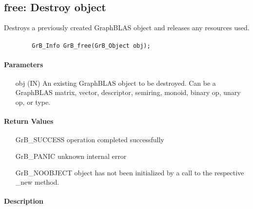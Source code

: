 \subsection{{\sf free}: Destroy object}

Destroys a previously created GraphBLAS object and releases any resources used.

\paragraph{\syntax}

\begin{verbatim}
        GrB_Info GrB_free(GrB_Object obj);
\end{verbatim}


\paragraph{Parameters}

\begin{itemize}[leftmargin=1.1in]
	\item[{\sf obj}] ({\sf IN}) An existing GraphBLAS object to be destroyed. 
    Can be a GraphBLAS matrix, vector, descriptor, semiring, monoid, binary op, 
    unary op, or type.
\end{itemize}

\paragraph{Return Values}

\begin{itemize}[leftmargin=2.1in]
\item[{\sf GrB\_SUCCESS}]        operation completed successfully
\item[{\sf GrB\_PANIC}]          unknown internal error
\item[{\sf GrB\_NOOBJECT}]       object has not been initialized by a call 
                                 to the respective {\sf *\_new} method.
\end{itemize}

\paragraph{Description}


